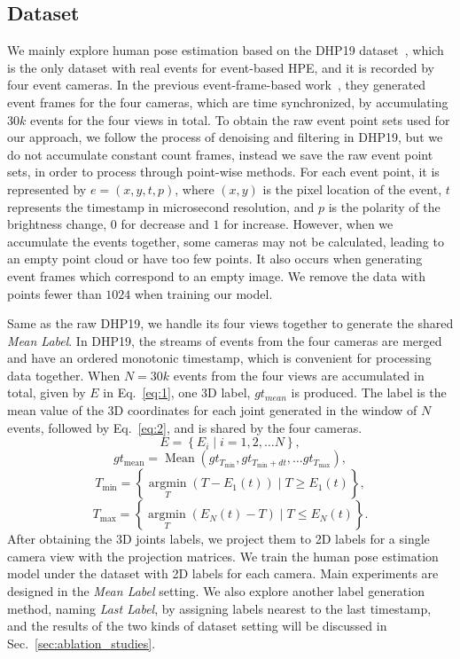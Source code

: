 \documentclass[10pt,twocolumn,letterpaper]{article}
\begin{document}
\subsection{Dataset}
\label{sec:approach_dataset}
We mainly explore human pose estimation based on the DHP19 dataset~\cite{calabrese2019dhp19}, which is the only dataset with real events for event-based HPE, and it is recorded by four event cameras.
In the previous event-frame-based work~\cite{calabrese2019dhp19}, they generated event frames for the four cameras, which are time synchronized, by accumulating $30k$ events for the four views in total.
To obtain the raw event point sets used for our approach, we follow the process of denoising and filtering in DHP19, but we do not accumulate constant count frames, instead we save the raw event point sets, in order to process through point-wise methods. For each event point, it is represented by $e = (x, y, t, p)$, where $(x,y)$ is the pixel location of the event, $t$ represents the timestamp in microsecond resolution, and $p$ is the polarity of the brightness change, $0$ for decrease and $1$ for increase. However, when we accumulate the events together, some cameras may not be calculated, leading to an empty point cloud or have too few points.
It also occurs when generating event frames which correspond to an empty image.
We remove the data with points fewer than $1024$ when training our model.

Same as the raw DHP19, we handle its four views together to generate the shared \emph{Mean Label}.
In DHP19, the streams of events from the four cameras are merged and have an ordered monotonic timestamp, which is convenient for processing data together.
When $N=30k$ events from the four views are accumulated in total, given by $E$ in Eq.~\ref{eq:1}, one 3D label, $gt_{mean}$ is produced.
The label is the mean value of the 3D coordinates for each joint generated in the window of $N$ events, followed by Eq.~\ref{eq:2}, and is shared by the four cameras.
\begin{equation}\label{eq:1}
E=\left\{E_{i} \mid i=1,2, \ldots N\right\},
\end{equation}
\begin{equation}\label{eq:2}
gt_{\text{mean}}=\operatorname{Mean}\left(gt_{T_{\min}}, gt_{T_{\min} +dt}, \ldots gt_{T_{\max}}\right),
\end{equation}
\begin{equation}
T_{\min } = \left\{\mathop{\arg\min}\limits_{T}\left(T-E_{1}(t)\right) \mid T \geq E_{1}(t) \right\}, 
\end{equation}
\begin{equation}
T_{\max } = \left\{\mathop{\arg\min}\limits_{T}\left(E_{N}(t)-T\right) \mid T \leq E_{N}(t)\right\}.
\end{equation}
After obtaining the 3D joints labels, we project them to 2D labels for a single camera view with the projection matrices.
We train the human pose estimation model under the dataset with 2D labels for each camera. Main experiments are designed in the \emph{Mean Label} setting. We also explore another label generation method, naming \emph{Last Label}, by assigning labels nearest to the last timestamp, and the results of the two kinds of dataset setting will be discussed in Sec.~\ref{sec:ablation_studies}. 
\end{document}
